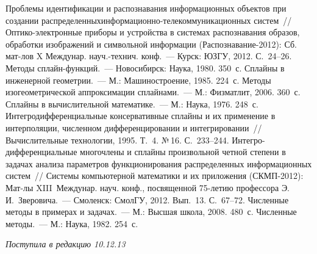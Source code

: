 \begin{multicols}{2}
{\small\frenchspacing
{%
\begin{thebibliography}{9}
 Проб\-ле\-мы 
идентификации и распознавания инфор\-мационных объектов при создании 
распределенных\linebreak ин\-фор\-ма\-ци\-он\-но-те\-ле\-ком\-му\-ни\-ка\-ци\-он\-ных 
сис\-тем~// Оп\-ти\-ко-элект\-рон\-ные приборы и устройства в сис\-те\-мах 
распознавания образов, обработки изображений и символьной информации 
(Распознавание-2012): Сб. мат-лов X Междунар. 
на\-уч.-технич. конф.~--- Курск: ЮЗГУ, 2012. С.~24--26. 
 Методы 
сплайн-функ\-ций.~--- Новосибирск: Наука, 1980. 350~с.
 Сплайны в инженерной 
геометрии.~--- М.: Машиностроение, 1985. 224~с.
 Методы изогеометрической аппроксимации сплайнами.~--- 
М.: Физматлит, 2006. 360~с.
 Сплайны в вычислительной 
математике.~--- М.: Наука, 1976. 248~с.
 Интегродифференциальные 
консервативные сплайны и их применение в интерполяции, чис\-лен\-ном 
дифференцировании и интегрировании~// Вычислительные технологии, 
1995. Т.~4. №\,16. С.~233--244. 
Ин\-тегро-диф\-фе\-рен\-ци\-аль\-ные многочлены и сплайны произволь\-ной 
четной степени в задачах анализа па\-ра\-мет\-ров функционирования 
распределенных информационных сис\-тем~// Сис\-те\-мы компьютерной 
математики и их приложения (СКМП-2012): Мат-лы XIII~Междунар. науч. 
конф., посвященной 75-ле\-тию профессора Э.\,И.~Зверовича.~--- 
Смоленск: СмолГУ, 2012. Вып.~13. С.~67--72. 
 Численные методы в примерах и 
задачах.~--- М.: Высшая школа, 2008. 480~с.
 Численные методы.~--- М.: Наука, 1982. 254~с.
\end{thebibliography}
} }

\end{multicols}

\vspace*{-12pt}

\hfill{\small\textit{Поступила в редакцию 10.12.13}}


\vspace*{12pt}

